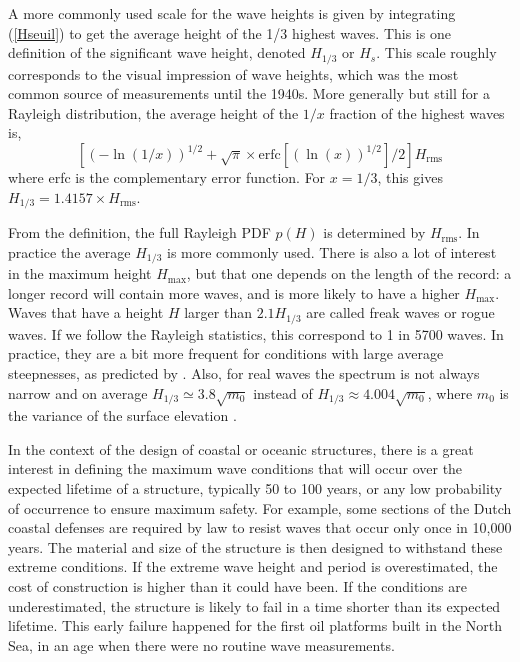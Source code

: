A more commonly used scale for the wave heights is given by integrating 
 (\ref{Hseuil}) to get the average height of the 1/3 highest waves. This is one definition of 
the significant wave height, denoted $H_{1/3}$ or $H_s$. This scale roughly corresponds to the visual impression of wave heights, which was the most common source 
of measurements until the 1940s. 
More generally but still for a Rayleigh distribution, the average height of the $1/x$ fraction of the highest waves is, 
\begin{equation}
\left[\left(-\ln(1/x)\right)^{1/2} + \sqrt{\pi} \times
{\mathrm{erfc}}\left[\left(\ln(x)\right)^{1/2}\right]/2\right]
H_{\mathrm{rms}}
\end{equation}
 where erfc is the complementary error function.  For 
$x=1/3$, this gives $H_{1/3}=1.4157 \times H_{\mathrm{rms}}$.

From the definition, the full Rayleigh PDF $p(H)$ is determined by $H_{\mathrm{rms}}$. In practice the average $H_{1/3}$ is more 
commonly used. There is also a lot of interest in the maximum height $H_{\mathrm{max}}$, but that one depends on the length of the 
record: a longer record will contain more waves, and is more likely to have a higher  $H_{\mathrm{max}}$. Waves that have a height
$H$ larger than $2.1 H_{1/3}$ are called freak waves or rogue waves. If we follow the Rayleigh statistics, 
this correspond to 1 in 5700 waves. In practice, they are a bit more frequent for conditions with large average steepnesses, as 
predicted by \cite{Tayfun1980}. Also, for real waves the spectrum is not always narrow and on average $H_{1/3} \simeq 3.8 \sqrt{m_0}$
instead of $H_{1/3} \approx 4.004 \sqrt{m_0}$, where $m_0$ is the variance of the surface elevation \citep{Goda1985}.

In the context of the design of coastal or oceanic structures,  there is a great interest in defining the 
maximum wave conditions that will occur over the expected lifetime of a structure, typically 50 to 100 years, 
or  any low probability of occurrence to ensure maximum safety. For example, some sections of the Dutch coastal defenses
are required by law to resist waves that occur only once in 10,000 years. 
The material and size of the structure is then designed to withstand 
these extreme conditions. If the extreme wave height and period is overestimated, the cost of construction 
is higher than it could have been. If the conditions are underestimated, the structure is likely to fail in a time shorter
than its expected lifetime. This early failure happened for the first oil platforms built in the North Sea, in an age
when there were no routine wave measurements. 

